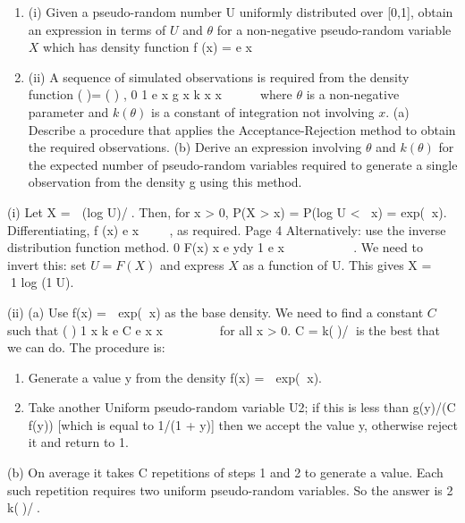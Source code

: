 \documentclass[a4paper,12pt]{article}
\begin{document}
\begin{enumerate}

\item (i) Given a pseudo-random number U uniformly distributed over [0,1], obtain an expression in terms of $U$ and $\theta$  for a non-negative pseudo-random variable $X$ which has density function
f (x) = e x 
 
\item (ii) A sequence of simulated observations is required from the density function
( )= ( ) , 0
1
e x g x k x
x

 

where $\theta$ is a non-negative parameter and $k(\theta )$ is a constant of integration not
involving $x$.
(a) Describe a procedure that applies the Acceptance-Rejection method to obtain the required observations.
(b) Derive an expression involving $\theta$  and $k(\theta )$ for the expected number of pseudo-random variables required to generate a single observation
from the density g using this method.
\end{enumerate}


 (i) Let X =  (log U)/. Then, for x > 0,
P(X > x) = P(log U < x) = exp(x).
Differentiating, f (x) e x 
  , as required.
Page 4
Alternatively: use the inverse distribution function method.
0
F(x) x e ydy 1 e x    
    . We need to invert this: set $U = F(X)$ and express $X$ as a function of U. This gives X =   1 log (1U).

(ii) (a) Use f(x) =  exp(x) as the base density. We need to find a constant $C$ such that ( )
1
x
k e C e x
x


  

for all x > 0.
C = k()/ is the best that we can do.
The procedure is:
\begin{enumerate}
\item Generate a value y from the density f(x) =  exp(x).
\item Take another Uniform pseudo-random variable U2; if this is less than g(y)/(C f(y)) [which is equal to 1/(1 + y)] then we accept the
value y, otherwise reject it and return to 1.
\end{enumerate}
(b) On average it takes C repetitions of steps 1 and 2 to generate a value.
Each such repetition requires two uniform pseudo-random variables.
So the answer is 2 k()/.

\end{document}
